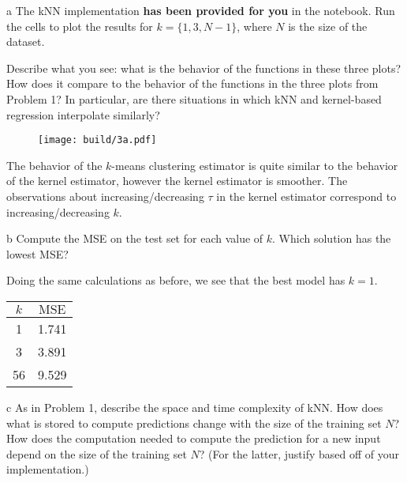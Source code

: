\documentclass[expanded]{lkx_pset}
\begin{document}
\begin{parts}
	\begin{part}{a}
		The kNN implementation \textbf{has been provided for you} in the notebook. Run the cells to plot the results for $k=\{1, 3, N-1\}$, where $N$ is the size of the dataset.

		Describe what you see: what is the behavior of the functions in
		these three plots?  How does it compare to the behavior of the
		functions in the three plots from Problem 1? In particular, are
		there situations in which kNN and kernel-based regression
		interpolate similarly?
	\end{part}

	\begin{figure}[ht]
		\centering
		\texttt{[image: build/3a.pdf]}
	\end{figure}\noindent

	The behavior of the $k$-means clustering estimator is quite similar to the behavior of the kernel estimator, however the kernel estimator is smoother. The observations about increasing/decreasing $\tau$ in the kernel estimator correspond to increasing/decreasing $k$.

	\begin{part}{b}
		Compute the MSE on the test set for each value of $k$.  Which solution has the lowest MSE?
	\end{part}

	Doing the same calculations as before, we see that the best model has $k=1$.
	\begin{center}
		\renewcommand*{\arraystretch}{1.2}
		\begin{tabular}{|c|c|}
			\hline
			$k$ & $\textrm{MSE}$ \\
			\hline
			1   & 1.741          \\
			3   & 3.891          \\
			56  & 9.529          \\
			\hline
		\end{tabular}
	\end{center}

	\begin{part}{c}
		As in Problem 1, describe the space and time complexity of kNN.  How does what is stored to compute predictions change with the size of the training set $N$?  How does the computation needed to compute the prediction for a new input depend on the size of the training set $N$? (For the latter, justify based off of your implementation.)
	\end{part}


\end{parts}
\end{document}
